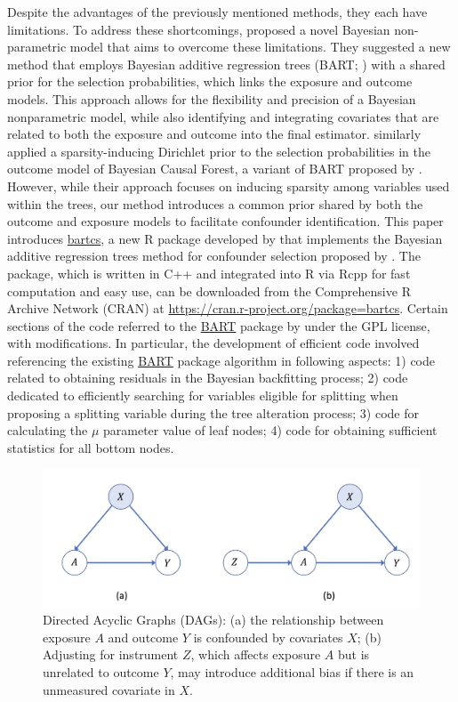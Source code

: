 Despite the advantages of the previously mentioned methods, they each have limitations. To address these shortcomings, \cite{kim2023bnp} proposed a novel Bayesian non-parametric model that aims to overcome these limitations. They suggested a new method that employs Bayesian additive regression trees (BART; \cite{chipman2010bart}) with a shared prior for the selection probabilities, which links the exposure and outcome models. This approach allows for the flexibility and precision of a Bayesian nonparametric model, while also identifying and integrating covariates that are related to both the exposure and outcome into the final estimator. \cite{caron2022shrinkage} similarly applied a sparsity-inducing Dirichlet prior to the selection probabilities in the outcome model of Bayesian Causal Forest, a variant of BART proposed by \cite{hahn2020bayesian}. However, while their approach focuses on inducing sparsity among variables used within the trees, our method introduces a common prior shared by both the outcome and exposure models to facilitate confounder identification. This paper introduces \href{https://CRAN.R-project.org/package=bartcs}{bartcs}, a new  R package developed by \cite{bartcs} that implements the Bayesian additive regression trees method for confounder selection proposed by \cite{kim2023bnp}. The package, which is written in C++ and integrated into R via Rcpp for fast computation and easy use, can be downloaded from the Comprehensive R Archive Network (CRAN) at \href{https://cran.r-project.org/package=bartcs}{https://cran.r-project.org/package=bartcs}. Certain sections of the code referred to the \href{https://cran.r-project.org/web/packages/BART/index.html}{BART} package by \cite{BART} under the GPL license, with modifications. In particular, the development of efficient code involved referencing the existing \href{https://cran.r-project.org/web/packages/BART/index.html}{BART} package algorithm in following aspects: 1) code related to obtaining residuals in the Bayesian backfitting process; 2) code dedicated to efficiently searching for variables eligible for splitting when proposing a splitting variable during the tree alteration process; 3) code for calculating the $\mu$ parameter value of leaf nodes; 4) code for obtaining sufficient statistics for all bottom nodes.

\begin{figure}[htbp]
\centering
\includegraphics[width=0.85\linewidth]{fig/fig0.png}
\caption{Directed Acyclic Graphs (DAGs): (a) the relationship between exposure $A$ and outcome $Y$ is confounded by covariates $X$; (b) Adjusting for instrument $Z$, which affects exposure $A$ but is unrelated to outcome $Y$, may introduce additional bias if there is an unmeasured covariate in $X$.
}\label{fig:dag}
\end{figure}


